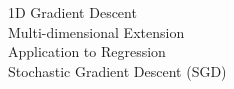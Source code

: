 \documentclass[preview]{standalone}
\begin{document}
1D Gradient Descent\\Multi-dimensional Extension\\Application to Regression\\Stochastic Gradient Descent (SGD)\\
\end{document}
